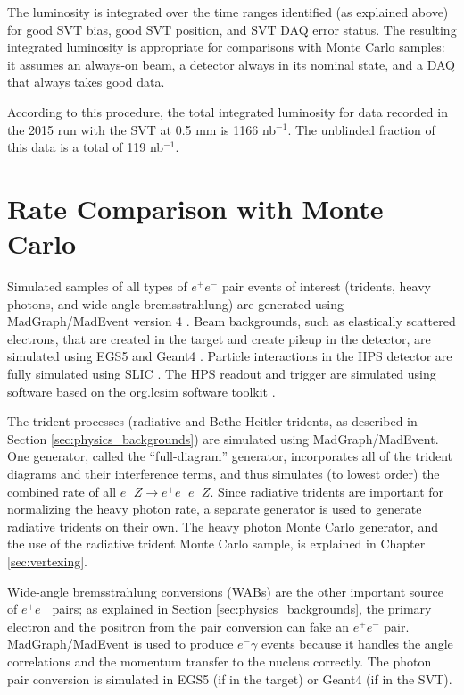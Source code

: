 The luminosity is integrated over the time ranges identified (as explained above) for good SVT bias, good SVT position, and SVT DAQ error status.
The resulting integrated luminosity is appropriate for comparisons with Monte Carlo samples: it assumes an always-on beam, a detector always in its nominal state, and a DAQ that always takes good data.

According to this procedure, the total integrated luminosity for data recorded in the 2015 run with the SVT at 0.5 mm is 1166 nb$^{-1}$.
The unblinded fraction of this data is a total of 119 nb$^{-1}$.

\section{Rate Comparison with Monte Carlo}
\label{sec:rates}

\label{sec:tri_mc}
Simulated samples of all types of $e^+e^-$ pair events of interest (tridents, heavy photons, and wide-angle bremsstrahlung) are generated using MadGraph/MadEvent version 4 \cite{alwall_madgraph/madevent_2007}.
Beam backgrounds, such as elastically scattered electrons, that are created in the target and create pileup in the detector, are simulated using EGS5 \cite{hirayama_egs5_2005} and Geant4 \cite{agostinelli_geant4simulation_2003}.
Particle interactions in the HPS detector are fully simulated using SLIC \cite{graf_simulator_2006}.
The HPS readout and trigger are simulated using software based on the org.lcsim software toolkit \cite{graf_org.lcsim:_2011}.

The trident processes (radiative and Bethe-Heitler tridents, as described in Section \ref{sec:physics_backgrounds}) are simulated using MadGraph/MadEvent.
One generator, called the ``full-diagram'' generator, incorporates all of the trident diagrams and their interference terms, and thus simulates (to lowest order) the combined rate of all $e^-Z\to e^+e^-e^-Z$.
Since radiative tridents are important for normalizing the heavy photon rate, a separate generator is used to generate radiative tridents on their own.
The heavy photon Monte Carlo generator, and the use of the radiative trident Monte Carlo sample, is explained in Chapter \ref{sec:vertexing}.

Wide-angle bremsstrahlung conversions (WABs) are the other important source of $e^+e^-$ pairs; as explained in Section \ref{sec:physics_backgrounds}, the primary electron and the positron from the pair conversion can fake an $e^+e^-$ pair.
MadGraph/MadEvent is used to produce $e^-\gamma$ events because it handles the angle correlations and the momentum transfer to the nucleus correctly.
The photon pair conversion is simulated in EGS5 (if in the target) or Geant4 (if in the SVT).

